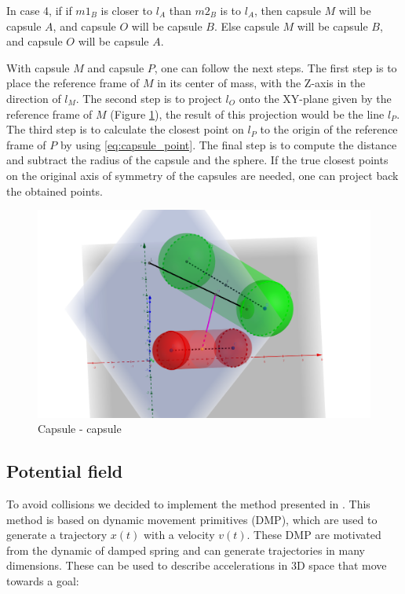 \documentclass[a4paper, 10pt, conference]{ieeeconf}      %
\begin{document}
In case 4, if if $m1_B$ is closer to $l_A$ than $m2_B$ is to $l_A$, then capsule $M$ will be capsule $A$, and capsule $O$ will be capsule $B$.
Else capsule $M$ will be capsule $B$, and capsule $O$ will be capsule $A$.

With capsule $M$ and capsule $P$, one can follow the next steps.
The first step is to place the reference frame of $M$ in its center of mass, with the Z-axis in the direction of $l_M$. 
The second step is to project $l_O$ onto the XY-plane given by the reference frame of $M$ (Figure \ref{fig:capsule_capsule}),
the result of this projection would be the line $l_P$.
The third step is to calculate the closest point on $l_P$ to the origin of the reference frame of $P$ by using \eqref{eq:capsule_point}. 
The final step is to compute the distance and subtract the radius of the capsule and the sphere.
If the true closest points on the original axis of symmetry of the capsules are needed, one can project back the obtained points.

\begin{figure}[H]
    \centering
    \includegraphics[scale=0.15]{images/capsule-capsule.png}
    \caption{Capsule - capsule}
    \label{fig:capsule_capsule}
\end{figure}


\subsection{Potential field} %

To avoid collisions we decided to implement the method presented in \cite{1}. This method is based on dynamic movement primitives (DMP), which are used to generate a trajectory $x(t)$ with a velocity $v(t)$. These DMP are motivated from the dynamic of damped spring and can generate trajectories in many dimensions. These can be used to describe accelerations in 3D space that move towards a goal:
\end{document}

